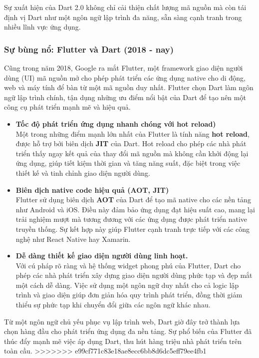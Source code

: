 \documentclass[../DoAn.tex]{subfiles}
\numberwithin{figure}{chapter}
\begin{document}
Sự xuất hiện của Dart 2.0 không chỉ cải thiện chất lượng mã nguồn mà còn tái định vị Dart như một ngôn ngữ lập trình đa năng, sẵn sàng cạnh tranh trong nhiều lĩnh vực ứng dụng.

\subsubsection{Sự bùng nổ: Flutter và Dart (2018 - nay)}

Cũng trong năm 2018, Google ra mắt Flutter, một framework giao diện người dùng (UI) mã nguồn mở cho phép phát triển các ứng dụng native cho di động, web và máy tính để bàn từ một mã nguồn duy nhất. Flutter chọn Dart làm ngôn ngữ lập trình chính, tận dụng những ưu điểm nổi bật của Dart để tạo nên một công cụ phát triển mạnh mẽ và hiệu quả.

\begin{itemize}
    \item \textbf{Tốc độ phát triển ứng dụng nhanh chóng với hot reload)} \\[0.5em]
    Một trong những điểm mạnh lớn nhất của Flutter là tính năng \textbf{hot reload}, được hỗ trợ bởi biên dịch \textbf{JIT} của Dart. Hot reload cho phép các nhà phát triển thấy ngay kết quả của thay đổi mã nguồn mà không cần khởi động lại ứng dụng, giúp tiết kiệm thời gian và tăng năng suất, đặc biệt trong việc thiết kế và tinh chỉnh giao diện người dùng.
    \item \textbf{Biên dịch native code hiệu quả (AOT, JIT)} \\[0.5em]
    Flutter sử dụng biên dịch \textbf{AOT} của Dart để tạo mã native cho các nền tảng như Android và iOS. Điều này đảm bảo ứng dụng đạt hiệu suất cao, mang lại trải nghiệm mượt mà tương đương với các ứng dụng được phát triển native truyền thống. Sự kết hợp này giúp Flutter cạnh tranh trực tiếp với các công nghệ như React Native hay Xamarin.
    \item \textbf{Dễ dàng thiết kế giao diện người dùng linh hoạt.} \\[0.5em]
    Với cú pháp rõ ràng và hệ thống widget phong phú của Flutter, Dart cho phép các nhà phát triển xây dựng giao diện người dùng phức tạp và đẹp mắt một cách dễ dàng. Việc sử dụng một ngôn ngữ duy nhất cho cả logic lập trình và giao diện giúp đơn giản hóa quy trình phát triển, đồng thời giảm thiểu sự phức tạp khi chuyển đổi giữa các ngôn ngữ khác nhau.
\end{itemize}

Từ một ngôn ngữ chủ yếu phục vụ lập trình web, Dart giờ đây trở thành lựa chọn hàng đầu cho phát triển ứng dụng đa nền tảng. Sự phổ biến của Flutter đã thúc đẩy mạnh mẽ việc áp dụng Dart, thu hút hàng triệu nhà phát triển trên toàn cầu.
>>>>>>> e99cf771c83e18ae8ecc6bb8d6dc5eff79ee4fb1
\end{document}
